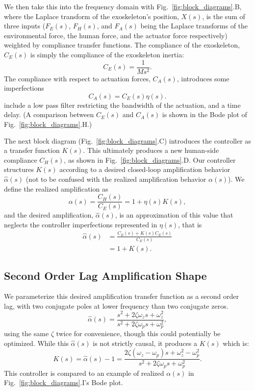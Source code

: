 We then take this into the frequency domain with Fig.~\ref{fig:block_diagrams}.B, where the Laplace transform of the exoskeleton's position, $X(s)$, is the sum of three inputs ($F_E(s)$, $F_H(s)$, and $F_A(s)$ being the Laplace transforms of the environmental force, the human force, and the actuator force respectively) weighted by compliance transfer functions. The compliance of the exoskeleton, $C_E(s)$ is simply the compliance of the exoskeleton inertia:
\begin{equation}
C_E(s) = \frac1{M s^2}.
\end{equation}
The compliance with respect to actuation forces, $C_A(s)$, introduces some imperfections 
\begin{equation}
C_A(s) = C_E(s) \eta(s).
\end{equation}
 include a low pass filter restricting the bandwidth of the actuation, and a time delay. (A comparison between $C_E(s)$ and $C_A(s)$ is shown in the Bode plot of Fig.~\ref{fig:block_diagrams}.H.)

The next block diagram (Fig.~\ref{fig:block_diagrams}.C) introduces the controller as a transfer function $K(s)$. This ultimately produces a new human-side compliance $C_H(s)$, as shown in Fig.~\ref{fig:block_diagrams}.D. Our controller structures $K(s)$ according to a desired closed-loop amplification behavior $\hat \alpha(s)$ (not to be confused with the realized amplification behavior $\alpha(s)$). We define the realized amplification as
\begin{equation}
\alpha(s) = \frac{C_H(s)}{C_E(s)} = 1 + \eta(s)K(s),
\end{equation}
and the desired amplification, $\hat\alpha(s)$, is an approximation of this value that neglects the controller imperfections represented in $\eta(s)$, that is
\begin{align}
\hat\alpha(s) &= \frac{C_E(s)+K(s)C_E(s)}{C_E(s)}\\
&= 1+K(s).
\end{align}


\subsection{Second Order Lag Amplification Shape}
We parameterize this desired amplification transfer function as a second order lag, with two conjugate poles at lower frequency than two conjugate zeros.
\begin{equation}
\hat\alpha(s) = \frac{s^2 + 2\zeta \omega_z s + \omega_z^2}{s^2 + 2\zeta \omega_p s + \omega_p^2},
\end{equation}
using the same $\zeta$ twice for convenience, though this could potentially be optimized. 
While this $\hat\alpha(s)$ is not strictly causal, it produces a $K(s)$ which is:
\begin{equation}
K(s) = \hat\alpha(s)-1 = \frac{2\zeta (\omega_z-\omega_p) s + \omega_z^2-\omega_p^2}{s^2 + 2\zeta \omega_p s + \omega_p^2}.
\end{equation}
This controller is compared to an example of realized $\alpha(s)$ in Fig.~\ref{fig:block_diagrams}.I's Bode plot.

